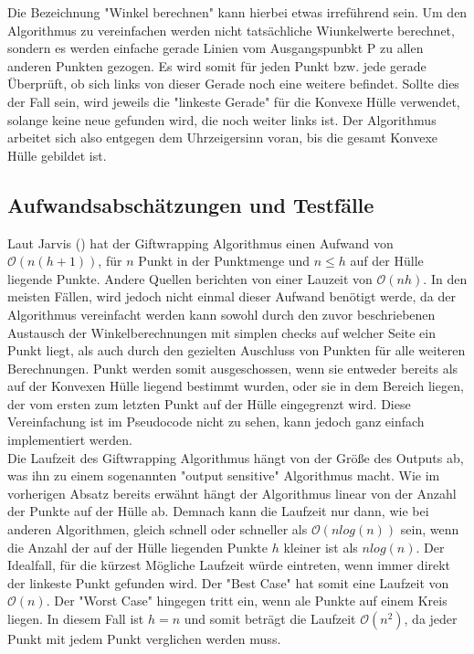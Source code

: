 \documentclass[Labor, MSC, german]{twbook}
\begin{document}
Die Bezeichnung "Winkel berechnen" kann hierbei etwas irreführend sein. Um den Algorithmus zu vereinfachen werden nicht tatsächliche Wiunkelwerte berechnet, sondern es werden einfache gerade Linien vom Ausgangspunbkt P zu allen anderen Punkten gezogen. Es wird somit für jeden Punkt bzw. jede gerade Überprüft, ob sich links von dieser Gerade noch eine weitere befindet. Sollte dies der Fall sein, wird jeweils die "linkeste Gerade" für die Konvexe Hülle verwendet, solange keine neue gefunden wird, die noch weiter links ist. Der Algorithmus arbeitet sich also entgegen dem Uhrzeigersinn voran, bis die gesamt Konvexe Hülle gebildet ist.

\subsection{Aufwandsabschätzungen und Testfälle}
Laut Jarvis (\cite{JARVIS197318}) hat der Giftwrapping Algorithmus einen Aufwand von $\mathcal{O}(n(h+1))$, für $n$ Punkt in der Punktmenge und $n\leq h$ auf der Hülle liegende Punkte. Andere Quellen berichten von einer Lauzeit von $\mathcal{O}(nh)$. In den meisten Fällen, wird jedoch nicht einmal dieser Aufwand benötigt werde, da der Algorithmus vereinfacht werden kann sowohl durch den zuvor beschriebenen Austausch der Winkelberechnungen mit simplen checks auf welcher Seite ein Punkt liegt, als auch durch den gezielten Auschluss von Punkten für alle weiteren Berechnungen. Punkt werden somit ausgeschossen, wenn sie entweder bereits als auf der Konvexen Hülle liegend bestimmt wurden, oder sie in dem Bereich liegen, der vom ersten zum letzten Punkt auf der Hülle eingegrenzt wird. Diese Vereinfachung ist im Pseudocode nicht zu sehen, kann jedoch ganz einfach implementiert werden.\\

Die Laufzeit des Giftwrapping Algorithmus hängt von der Größe des Outputs ab, was ihn zu einem sogenannten "output sensitive" Algorithmus macht. Wie im vorherigen Absatz bereits erwähnt hängt der Algorithmus linear von der Anzahl der Punkte auf der Hülle ab. Demnach kann die Laufzeit nur dann, wie bei anderen Algorithmen, gleich schnell oder schneller als $\mathcal{O}(nlog(n))$ sein, wenn die Anzahl der auf der Hülle liegenden Punkte $h$ kleiner ist als $nlog(n)$. Der Idealfall, für die kürzest Mögliche Laufzeit würde eintreten, wenn immer direkt der linkeste Punkt gefunden wird. Der "Best Case" hat somit eine Laufzeit von  $\mathcal{O}(n)$. Der "Worst Case" hingegen tritt ein, wenn ale Punkte auf einem Kreis liegen. In diesem Fall ist 
$h=n$ und somit beträgt die Laufzeit $\mathcal{O}(n^2)$, da jeder Punkt mit jedem Punkt verglichen werden muss.
\end{document}
